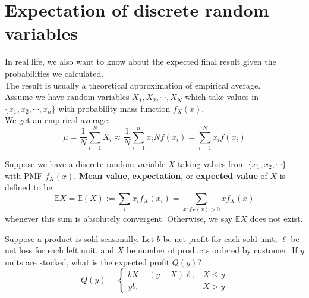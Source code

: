 \documentclass{huhtakm-template-book}
\newcommand{\expect}{\mathbb{E}}
\begin{document}
\section{Expectation of discrete random variables}
    In real life, we also want to know about the expected final result given the probabilities we calculated.\\
    The result is usually a theoretical approximation of empirical average.\\
    Assume we have random variables $X_{1},X_{2},\cdots,X_{N}$ which take values in $\{x_{1},x_{2},\cdots,x_{n}\}$ with probability mass function $f_{X}(x)$.\\
    We get an empirical average:
    \begin{equation*}
        \mu=\frac{1}{N}\sum_{i=1}^{N}X_{i}\approx\frac{1}{N}\sum_{i=1}^{n}x_{i}Nf(x_{i})=\sum_{i=1}^{N}x_{i}f(x_{i})
    \end{equation*}
    \begin{defn}
        Suppose we have a discrete random variable $X$ taking values from $\{x_{1},x_{2},\cdots\}$ with PMF $f_{X}(x)$. \textbf{Mean value}, \textbf{expectation}, or \textbf{expected value} of $X$ is defined to be:
        \begin{equation*}
            \expect X=\expect(X):=\sum_{i}x_{i}f_{X}(x_{i})=\sum_{x:f_{X}(x)>0}xf_{X}(x)
        \end{equation*}
        whenever this sum is absolutely convergent. Otherwise, we say $\expect X$ does not exist.
    \end{defn}
    \begin{eg}
        Suppose a product is sold seasonally. Let $b$ be net profit for each sold unit, $\ell$ be net loss for each left unit, and $X$ be number of products ordered by customer. If $y$ units are stocked, what is the expected profit $Q(y)$?
        \begin{equation*}
            Q(y)=\begin{cases}
                bX-(y-X)\ell, &X\leq y\\
                yb, &X>y
            \end{cases}
        \end{equation*}
    \end{eg}
    \newpage
    
\end{document}
